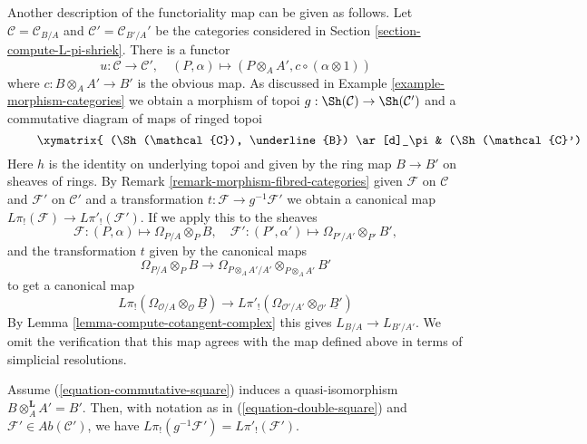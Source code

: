 \medskip\noindent
Another description of the functoriality map can be given as follows.
Let $\mathcal{C} = \mathcal{C}_{B/A}$ and $\mathcal{C}' = \mathcal{C}_{B'/A}'$
be the categories considered in Section \ref{section-compute-L-pi-shriek}.
There is a functor
$$
u : \mathcal{C} \longrightarrow \mathcal{C}',\quad
(P, \alpha) \longmapsto (P \otimes_A A', c \circ (\alpha \otimes 1))
$$
where $c : B \otimes_A A' \to B'$ is the obvious map. As discussed in
Example \ref{example-morphism-categories} we obtain a morphism of topoi
$g : \Sh(\mathcal{C}) \to \Sh(\mathcal{C}')$ and a commutative
diagram of maps of ringed topoi
\begin{equation}
\label{equation-double-square}
\vcenter{
\xymatrix{
(\Sh(\mathcal{C}), \underline{B}) \ar[d]_\pi &
(\Sh(\mathcal{C}'), \underline{B'}) \ar[d]_\pi \ar[l]^h \ar[r]_g &
(\Sh(\mathcal{C}), \underline{B'}) \ar[d]_{\pi'} \\
(\Sh(*), B) &
(\Sh(*), B') \ar[l]_f \ar[r] &
(\Sh(*), B')
}
}
\end{equation}
Here $h$ is the identity on underlying topoi and given by the ring map
$B \to B'$ on sheaves of rings. 
By Remark \ref{remark-morphism-fibred-categories}
given $\mathcal{F}$ on $\mathcal{C}$ and $\mathcal{F}'$ on $\mathcal{C}'$
and a transformation $t : \mathcal{F} \to g^{-1}\mathcal{F}'$
we obtain a canonical map $L\pi_!(\mathcal{F}) \to L\pi'_!(\mathcal{F}')$.
If we apply this to the sheaves
$$
\mathcal{F} : (P, \alpha) \mapsto \Omega_{P/A} \otimes_P B,\quad
\mathcal{F}' : (P', \alpha') \mapsto \Omega_{P'/A'} \otimes_{P'} B',
$$
and the transformation $t$ given by the canonical maps
$$
\Omega_{P/A} \otimes_P B \longrightarrow
\Omega_{P \otimes_A A'/A'} \otimes_{P \otimes_A A'} B'
$$
to get a canonical map
$$
L\pi_!(\Omega_{\mathcal{O}/A} \otimes_\mathcal{O} \underline{B})
\longrightarrow
L\pi'_!(\Omega_{\mathcal{O}'/A'} \otimes_{\mathcal{O}'} \underline{B'})
$$
By Lemma \ref{lemma-compute-cotangent-complex} this gives
$L_{B/A} \to L_{B'/A'}$. We omit the verification that this map
agrees with the map defined above in terms of simplicial
resolutions.

\begin{lemma}
\label{lemma-flat-base-change}
Assume (\ref{equation-commutative-square}) induces a quasi-isomorphism
$B \otimes_A^\mathbf{L} A' = B'$. Then, with notation as in
(\ref{equation-double-square}) and
$\mathcal{F}' \in \textit{Ab}(\mathcal{C}')$,
we have $L\pi_!(g^{-1}\mathcal{F}') = L\pi'_!(\mathcal{F}')$.
\end{lemma}

